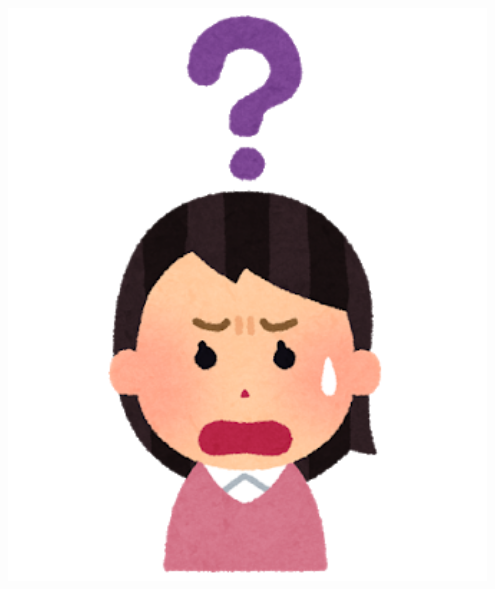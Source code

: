 \begin{frame}
\begin{columns}
\begin{column}{0.2\textwidth}
\begin{center}
        \includegraphics[width=0.95\textwidth]{img/question_head_gakuzen_girl.png}
      \end{center}
    \end{column}
  \end{columns}

  \begin{center}
  \end{center}
\end{frame}


